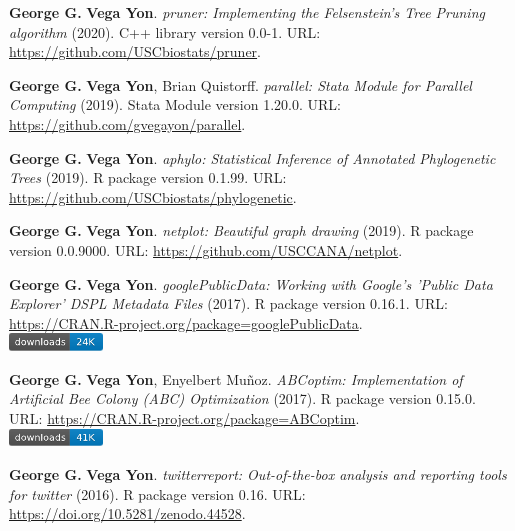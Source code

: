 \item {\bfseries George G.} {\bfseries Vega Yon}. \textit{pruner: Implementing the Felsenstein's Tree Pruning algorithm} (2020). C++ library version 0.0-1. {\small URL}: \url{https://github.com/USCbiostats/pruner}.  
\item {\bfseries George G.} {\bfseries Vega Yon}, Brian Quistorff. \textit{parallel: Stata Module for Parallel Computing} (2019). Stata Module version 1.20.0. {\small URL}: \url{https://github.com/gvegayon/parallel}.  
\item {\bfseries George G.} {\bfseries Vega Yon}. \textit{aphylo: Statistical Inference of Annotated Phylogenetic Trees} (2019). R package version 0.1.99. {\small URL}: \url{https://github.com/USCbiostats/phylogenetic}.  
\item {\bfseries George G.} {\bfseries Vega Yon}. \textit{netplot: Beautiful graph drawing} (2019). R package version 0.0.9000. {\small URL}: \url{https://github.com/USCCANA/netplot}.  
\item {\bfseries George G.} {\bfseries Vega Yon}. \textit{googlePublicData: Working with Google's 'Public Data Explorer' DSPL Metadata Files} (2017). R package version 0.16.1. {\small URL}: \url{https://CRAN.R-project.org/package=googlePublicData}. \\\includegraphics[width=2.5cm]{fig/cran-downloads-googlepublicdata.pdf} 
\item {\bfseries George G.} {\bfseries Vega Yon}, Enyelbert Muñoz. \textit{ABCoptim: Implementation of Artificial Bee Colony (ABC) Optimization} (2017). R package version 0.15.0. {\small URL}: \url{https://CRAN.R-project.org/package=ABCoptim}. \\\includegraphics[width=2.5cm]{fig/cran-downloads-abcoptim.pdf} 
\item {\bfseries George G.} {\bfseries Vega Yon}. \textit{{twitterreport: Out-of-the-box analysis and 
	reporting tools for twitter}} (2016). R package version 0.16. {\small URL}: \url{https://doi.org/10.5281/zenodo.44528}.  

